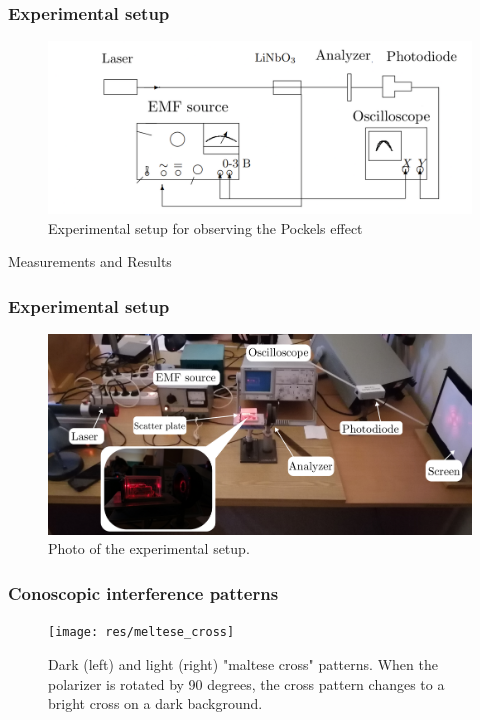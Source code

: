 \documentclass{beamer}
\begin{document}
\begin{frame}
	\frametitle{Experimental setup}
	
	\begin{figure}
		\centering
		\includegraphics[width=1\linewidth]{res/pockels_scheme}
		\caption{Experimental setup for observing the Pockels effect}
	\end{figure}

\end{frame}
	
\begin{frame}[plain,c]	
	\begin{center}
		\huge {} Measurements and Results
	\end{center}
\end{frame}	

\begin{frame}
	\frametitle{Experimental setup}
	\begin{figure}
		\centering
		\includegraphics[width=1\linewidth]{res/setup}
		\vspace{-10pt}
		\caption{\footnotesize Photo of the experimental setup. }
	\end{figure}
\end{frame}

\begin{frame}
	\frametitle{Conoscopic interference patterns}
	\begin{figure}
		\centering
		\texttt{[image: res/meltese\_cross]}
		\vspace{-10pt}
		\caption{\footnotesize  Dark (left) and light (right) "maltese cross" patterns. When the polarizer is rotated by 90 degrees, the cross pattern changes to a bright cross on a dark background. }
	\end{figure}
\end{frame}
\end{document}
